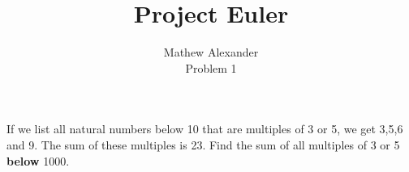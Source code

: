 \documentclass[12pt]{article}
\newenvironment{problem}[2][Problem]{\begin{trivlist}
\item[\hskip \labelsep {\bfseries #1}\hskip \labelsep {\bfseries #2.}]}{\end{trivlist}}
\begin{document}
 
 
\title{Project Euler}%
\author{Mathew Alexander\\ %
Problem 1} %
 
\maketitle
 
\begin{problem}{1}
If we list all natural numbers below 10 that are multiples of 3 or 5, we get 3,5,6 and 9. The sum of these multiples is 23.
Find the sum of all multiples of 3 or 5 \textbf{below} 1000.
\end{problem}
\end{document}

